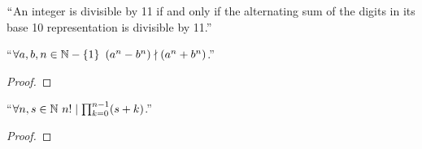         \begin{corollary}
            $``$An integer is divisible by 11 if and only if the alternating sum of the digits
            in its base 10 representation is divisible by 11.''
        \end{corollary}
        \begin{theorem}
            ``$\forall a, b, n \in \mathbb{N} - \left\{1\right\} \ (a^n - b^n) \nmid (a^n + b^n)$.'' 
        \end{theorem}
        \begin{proof}
        \end{proof}
        \begin{theorem}
            ``$\forall n, s \in \set{N} \ \divides{n!}{\prod_{k = 0}^{n - 1} (s + k)}$.''
        \end{theorem}
        \begin{proof}
        \end{proof}

